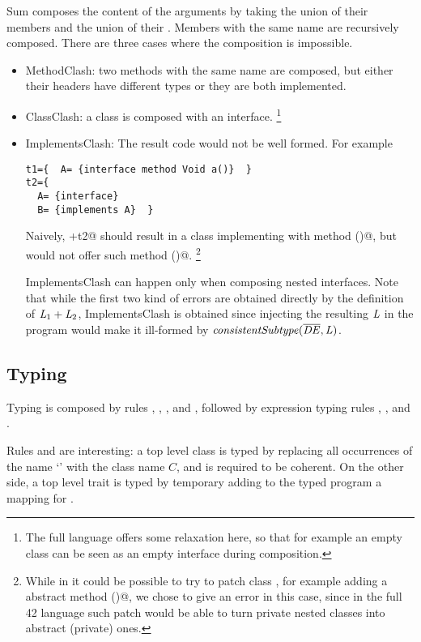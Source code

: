 Sum composes the content of the arguments
by taking the union of their members and the union of their \Q@implements@.
Members with the same name are recursively composed.
There are three cases where the composition is impossible.
\begin{itemize}
\item MethodClash: two methods with the same name are composed,
but either their headers have different types or they are both implemented.
\item ClassClash: a class is composed with an interface.%
\footnote{
The full language offers some relaxation here, so that for example an empty class can be seen as an empty interface during composition.
}
\item ImplementsClash:
The result code would not be well formed.
For example
\begin{lstlisting}
t1={  A= {interface method Void a()}  }
t2={
  A= {interface}
  B= {implements A}  }
\end{lstlisting}
Naively, +t2@ should result in a class \Q@B@ implementing \Q@A@ with method \Q@a()@,
but \Q@B@ would not offer such method \Q@a()@.%
\footnote{While in \name it could be possible to try to patch class \Q@B@, for example adding a
abstract method \Q@a()@, we chose to give an error in this case, since in the full 42 language
such patch would 
be able to turn private nested classes
into abstract (private) ones.}

ImplementsClash can happen only when composing nested interfaces. Note that while the first two kind of errors are obtained directly by the definition of 
$\mathit{L}_1+\mathit{L}_2$, ImplementsClash is obtained since injecting the resulting 
$\mathit{L}$ in the program would make it ill-formed by 
$\mathit{consistentSubtype}(\overline{\mathit{DE}},\mathit{L})$.
\end{itemize}
\saveSpace
\subsection{Typing}
\saveSpace
Typing is composed by rules , ,
,
 and ,
followed by expression typing rules
, ,  and .

Rules  and 
are interesting: a top level class is typed by replacing all occurrences of the name `\Q@This@' with the class name $C$,
and is required to be coherent.
On the other side, a top level trait is typed by temporary adding to the typed program a mapping for
\Q@This@.

